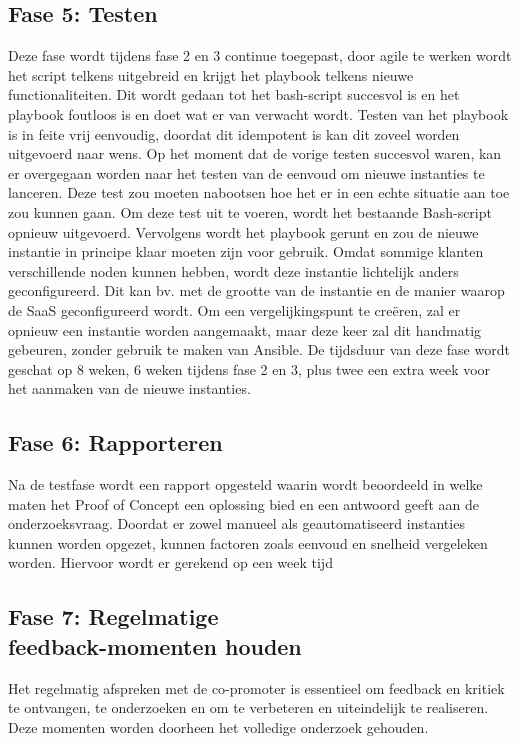 \subsection{Fase 5: Testen}
\label{subsec:Fase 5: Testen}
Deze fase wordt tijdens fase 2 en 3 continue toegepast, door agile te werken wordt het script telkens uitgebreid en krijgt het playbook 
telkens nieuwe functionaliteiten. Dit wordt gedaan tot het bash-script succesvol is 
en het playbook foutloos is en doet wat er van verwacht wordt. Testen van het playbook is in feite vrij eenvoudig, doordat dit idempotent is 
kan dit zoveel worden uitgevoerd naar wens. Op het moment dat de vorige testen succesvol waren, kan er overgegaan worden naar het testen 
van de eenvoud om nieuwe instanties te lanceren. Deze test zou moeten nabootsen hoe het er in een echte situatie aan toe zou kunnen gaan. 
Om deze test uit te voeren, wordt het bestaande Bash-script opnieuw uitgevoerd. Vervolgens wordt het playbook gerunt en zou de nieuwe instantie 
in principe klaar moeten zijn voor gebruik. Omdat sommige klanten verschillende noden kunnen hebben, wordt deze instantie lichtelijk anders geconfigureerd. 
Dit kan bv. met de grootte van de instantie en de manier waarop de SaaS geconfigureerd wordt. Om een vergelijkingspunt te creëren, zal er opnieuw 
een instantie worden aangemaakt, maar deze keer zal dit handmatig gebeuren, zonder gebruik te maken van Ansible. 
De tijdsduur van deze fase wordt geschat op 8 weken, 6 weken tijdens fase 2 en 3, plus twee een extra week voor het 
aanmaken van de nieuwe instanties.

\subsection{Fase 6: Rapporteren}
\label{subsec:Fase 6: Rapporteren}
Na de testfase wordt een rapport opgesteld waarin wordt beoordeeld in welke maten het Proof of Concept een oplossing bied en 
een antwoord geeft aan de onderzoeksvraag. Doordat er zowel manueel als geautomatiseerd instanties kunnen worden opgezet, kunnen 
factoren zoals eenvoud en snelheid vergeleken worden. Hiervoor wordt er gerekend op 
een week tijd

\subsection{Fase 7: Regelmatige \\feedback-momenten houden}
\label{subsec:Fase 7: Regelmatige feedback-momenten houden}
Het regelmatig afspreken met de co-promoter is essentieel om feedback en kritiek te ontvangen, te onderzoeken en om te verbeteren en 
uiteindelijk te realiseren. Deze momenten worden doorheen het volledige onderzoek gehouden.

